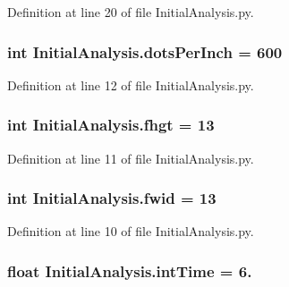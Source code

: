 Definition at line 20 of file Initial\-Analysis.\-py.

\hypertarget{namespace_initial_analysis_a8bfab69b06ade384b5c902e061dc311d}{
\subsubsection[{dots\-Per\-Inch}]{\setlength{\rightskip}{0pt plus 5cm}int Initial\-Analysis.\-dots\-Per\-Inch = 600}}\label{namespace_initial_analysis_a8bfab69b06ade384b5c902e061dc311d}


Definition at line 12 of file Initial\-Analysis.\-py.

\hypertarget{namespace_initial_analysis_a099c7053bbc362ba58a221726ce88895}{
\subsubsection[{fhgt}]{\setlength{\rightskip}{0pt plus 5cm}int Initial\-Analysis.\-fhgt = 13}}\label{namespace_initial_analysis_a099c7053bbc362ba58a221726ce88895}


Definition at line 11 of file Initial\-Analysis.\-py.

\hypertarget{namespace_initial_analysis_a3a4fd2196075d26dad36635ab7818084}{
\subsubsection[{fwid}]{\setlength{\rightskip}{0pt plus 5cm}int Initial\-Analysis.\-fwid = 13}}\label{namespace_initial_analysis_a3a4fd2196075d26dad36635ab7818084}


Definition at line 10 of file Initial\-Analysis.\-py.

\hypertarget{namespace_initial_analysis_a048ea28b3d1c9ecf031afaa3e87d0a47}{
\subsubsection[{int\-Time}]{\setlength{\rightskip}{0pt plus 5cm}float Initial\-Analysis.\-int\-Time = 6.}}\label{namespace_initial_analysis_a048ea28b3d1c9ecf031afaa3e87d0a47}


